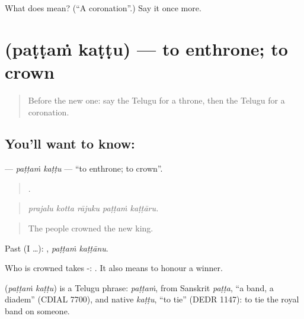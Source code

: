 \begin{tcolorbox}[breakable,colback=teal!4,colframe=teal!35!black,title={Before you move on}]
What does  mean? (\textquotedblleft{}A coronation\textquotedblright{}.) Say it once more.
\end{tcolorbox}
\section[\texorpdfstring{\te{పట్టం} \te{కట్టు} (paṭṭaṁ kaṭṭu)}{పట్టం కట్టు (paṭṭaṁ kaṭṭu)}]{  (paṭṭaṁ kaṭṭu) — to enthrone; to crown}

\label{lesson:TE-C335-pattam-kattu}



\begin{quote}
Before the new one: say the Telugu for a throne, then the Telugu for a coronation.
\end{quote}

\subsection*{You'll want to know:  }
\textbf{ } — \emph{paṭṭaṁ kaṭṭu} — \textquotedblleft{}to enthrone; to crown\textquotedblright{}.

\begin{quote}
    .
\end{quote}

\begin{quote}
\emph{prajalu kotta rājuku paṭṭaṁ kaṭṭāru.}
\end{quote}

\begin{quote}
The people crowned the new king.
\end{quote}

Past (I …):  , \emph{paṭṭaṁ kaṭṭānu}.

Who is crowned takes -:   . It also means to honour a winner.

\begin{cousinweb}
\textbf{ } (\emph{paṭṭaṁ kaṭṭu}) is a Telugu phrase: \emph{paṭṭaṁ}, from Sanskrit \emph{paṭṭa}, \textquotedblleft{}a band, a diadem\textquotedblright{} (CDIAL 7700), and native \emph{kaṭṭu}, \textquotedblleft{}to tie\textquotedblright{} (DEDR 1147): to tie the royal band on someone.
\end{cousinweb}

